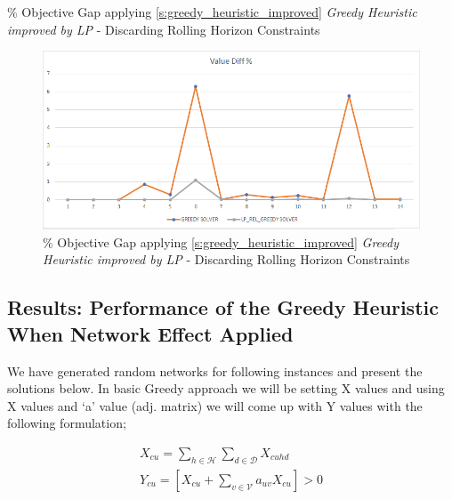 \documentclass[11pt]{article}
\begin{document}
{\begin{landscape}
        \begin{table}[htb]
                \centering
                \caption[Short Caption for LoT]{\% Objective Gap applying \ref{s:greedy_heuristic_improved} \textit{Greedy Heuristic improved by LP} - Discarding Rolling Horizon Constraints}\label{table:tbl_test_obj_diff_bett_no_rh}
        \end{table}
        \begin{figure}[htp]
            \centering
            \includegraphics[width=12cm]{value_diff_bett_no_rh}
            \caption{\% Objective Gap applying \ref{s:greedy_heuristic_improved} \textit{Greedy Heuristic improved by LP} - Discarding Rolling Horizon Constraints}
            \label{fig:fig_value_diff_bett_no_rh}
        \end{figure}
    \end{landscape}
    \clearpage%
}

\newpage

\subsection{Results: Performance of the Greedy Heuristic When Network Effect Applied} \label{s:test_evaluation_net_effect}
We have generated random networks for following instances and present the solutions below. In basic Greedy approach we will be setting X values and using X values and ‘a’ value (adj. matrix) we will come up with Y values with the following formulation;

\begin{align}
X_{{c}{u}}=\sum\limits_{h\in \mathcal{H}}\sum\limits_{d\in \mathcal{D}}
X_{{c}{u}{h}{d}} \label{net_perf_conv_x} \\
Y_{{c}{u}}=[X_{{c}{u}} + \sum\limits_{v\in \mathcal{V}}
a_{{u}{v}}X_{{c}{u}}] > 0 \label{net_perf_conv_y}
\end{align}\\
\end{document}
